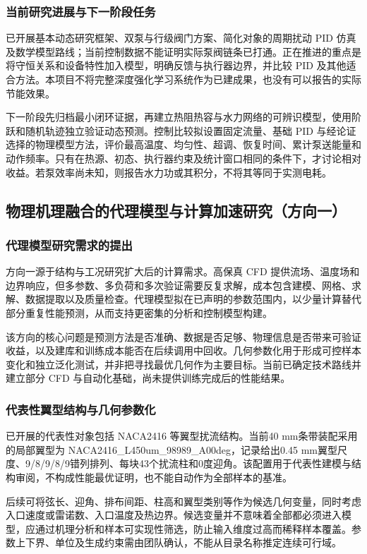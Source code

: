 \documentclass[stage2,UTF8,fontset=fandol]{ydzjreport}
\begin{document}
\subsubsection{当前研究进展与下一阶段任务}
已开展基本动态研究框架、双泵与行级阀门方案、简化对象的周期扰动 PID 仿真及数学模型路线；当前控制数据不能证明实际泵阀链条已打通。正在推进的重点是将守恒关系和设备特性加入模型，明确反馈与执行器边界，并比较 PID 及其他适合方法。本项目不将完整深度强化学习系统作为已建成果，也没有可以报告的实际节能效果。

下一阶段先归档最小闭环证据，再建立热阻热容与水力网络的可辨识模型，使用阶跃和随机轨迹独立验证动态预测。控制比较拟设置固定流量、基础 PID 与经论证选择的物理模型方法，评价最高温度、均匀性、超调、恢复时间、累计泵送能量和动作频率。只有在热源、初态、执行器约束及统计窗口相同的条件下，才讨论相对收益。若泵效率尚未知，则报告水力功或其积分，不将其等同于实测电耗。
\subsection{物理机理融合的代理模型与计算加速研究（方向一）}
\label{ch:surrogate}
\subsubsection{代理模型研究需求的提出}
方向一源于结构与工况研究扩大后的计算需求。高保真 CFD 提供流场、温度场和边界响应，但多参数、多负荷和多次验证需要反复求解，成本包含建模、网格、求解、数据提取以及质量检查。代理模型拟在已声明的参数范围内，以少量计算替代部分重复性能预测，从而支持更密集的分析和控制模型构建。

该方向的核心问题是预测方法是否准确、数据是否足够、物理信息是否带来可验证收益，以及建库和训练成本能否在后续调用中回收。几何参数化用于形成可控样本变化和独立泛化测试，并非把寻找最优几何作为主要目标。当前已确定技术路线并建立部分 CFD 与自动化基础，尚未提供训练完成后的性能结果。

\subsubsection{代表性翼型结构与几何参数化}
已开展的代表性对象包括 NACA2416 等翼型扰流结构。当前40 mm条带装配采用的局部翼型为 NACA2416\_L450um\_98989\_A00deg，记录给出0.45 mm翼型尺度、9/8/9/8/9错列排列、每块43个扰流柱和0度迎角。该配置用于代表性建模与结构审阅，不构成性能最优证明，也不能自动作为全部样本的基准。

后续可将弦长、迎角、排布间距、柱高和翼型类别等作为候选几何变量，同时考虑入口速度或雷诺数、入口温度及热边界。候选变量并不意味着全部都必须进入模型，应通过机理分析和样本可实现性筛选，防止输入维度过高而稀释样本覆盖。参数上下界、单位及生成约束需由团队确认，不能从目录名称推定连续可行域。
\end{document}
